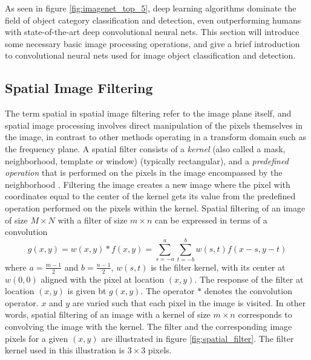 As seen in figure \ref{fig:imagenet_top_5}, deep learning algorithms dominate the field of object category classification and detection, even outperforming humans with state-of-the-art deep convolutional neural nets. This section will introduce some necessary basic image processing operations, and give a brief introduction to convolutional neural nets used for image object classification and detection.
\subsection{Spatial Image Filtering}
The term spatial in spatial image filtering refer to the image plane itself, and spatial image processing involves direct manipulation of the pixels themselves in the image, in contrast to other methods operating in a transform domain such as the frequency plane. A spatial filter consists of a \textit{kernel} (also called a mask, neighborhood, template or window) (typically rectangular), and a \textit{predefined operation} that is performed on the pixels in the image encompassed by the neighborhood \cite{digImage}. Filtering the image creates a new image where the pixel with coordinates equal to the center of the kernel gets its value from the predefined operation performed on the pixels within the kernel. Spatial filtering of an image of size $M\times N$ with a filter of size $m\times n$ can be expressed in terms of a convolution
\begin{equation}
\label{eq:spatial_filt}
    g(x,y)=w(x,y)*f(x,y)=\sum^{a}_{s=-a}\sum^{b}_{t=-b}w(s,t)f(x-s,y-t)
\end{equation}
where $a=\frac{m-1}{2}$ and $b=\frac{n-1}{2}$, $w(s,t)$ is the filter kernel, with its center at $w(0,0)$ aligned with the pixel at location $(x,y)$. The response of the filter at location $(x,y)$ is given bt $g(x,y)$. The operator $*$ denotes the convolution operator. $x$ and $y$ are varied such that each pixel in the image is visited. In other words, spatial filtering of an image with a kernel of size $m\times n$ corresponds to convolving the image with the kernel. The filter and the corresponding image pixels for a given $(x,y)$ are illustrated in figure \ref{fig:spatial_filter}. The filter kernel used in this illustration is $3\times3$ pixels.
